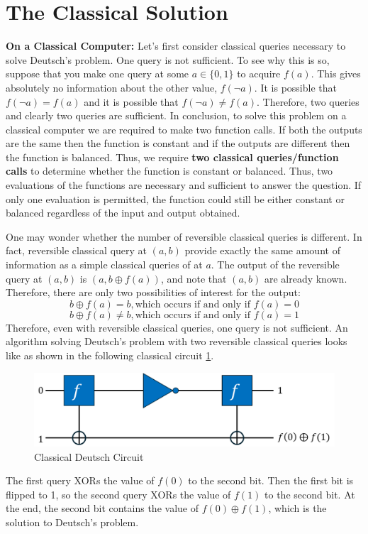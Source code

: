 \documentclass[12pt, oneside]{book}
\theoremstyle{definition}
\theoremstyle{definition}
\theoremstyle{remark}
\begin{document}
\section{The Classical Solution}
\textbf{On a Classical Computer: }Let's first consider classical queries necessary to solve Deutsch's problem. One query is not sufficient. To see why this is so, suppose that you make one query at some $a\in\{0,1\}$ to acquire $f(a)$. This gives absolutely no information about the other value, $f(\neg a)$. It is possible that $f(\neg a)=f(a)$ and it is possible that $f(\neg a)\neq f(a)$. Therefore, two queries and clearly two queries are sufficient. In conclusion, to solve this problem on a classical computer we are required to make two function calls. If both the outputs are the same then the function is constant and if the outputs are different then the function is balanced. Thus, we require \textbf{two classical queries/function calls} to determine whether the function is constant or balanced. Thus, two evaluations of the functions are necessary and sufficient to answer the question. If only one evaluation is permitted, the function could still be either constant or balanced regardless of the input and output obtained.

One may wonder whether the number of reversible classical queries is different. In fact, reversible classical query at $(a,b)$ provide exactly the same amount of information as a simple classical queries of at $a$. The output of the reversible query at $(a,b)$ is $(a,b\oplus f(a))$, and note that $(a,b)$ are already known. Therefore, there are only two possibilities of interest for the output:
\[
b\oplus f(a)=b, \text{which occurs if and only if $f(a)=0$}
\]
\[
b\oplus f(a) \neq b, \text{which occurs if and only if $f(a)=1$}
\]
Therefore, even with reversible classical queries, one query is not sufficient. An algorithm solving Deutsch's problem with two reversible classical queries looks like as shown in the following classical circuit \ref{fig:classical_deutsch}.

\begin{figure}
    \centering
    \includegraphics[width=1\linewidth]{../images/Deutsch_classical.png}
    \caption{Classical Deutsch Circuit}
    \label{fig:classical_deutsch}
\end{figure}
The first query XORs the value of $f(0)$ to the second bit. Then the first bit is flipped to 1, so the second query XORs the value of $f(1)$ to the second bit. At the end, the second bit contains the value of $f(0) \oplus f(1)$, which is the solution to Deutsch's problem.
\end{document}
